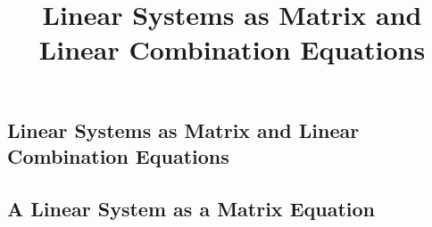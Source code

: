 \documentclass{ximera}
\title{Linear Systems as Matrix and Linear Combination Equations} \license{CC BY-NC-SA 4.0}
\begin{document}
\begin{abstract}
  
\end{abstract}
\maketitle

\begin{onlineOnly}
\section*{Linear Systems as Matrix and Linear Combination Equations}
\end{onlineOnly}

\subsection*{A Linear System as a Matrix Equation}
\end{document}
